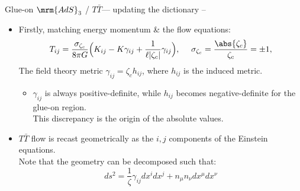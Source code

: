 \documentclass[
	10pt
	,handout
	,noamsthm
]{beamer}
\newcommand{\TTbar}{\texorpdfstring{\ensuremath{T\bar{T}}}{TTbar}\xspace}
\begin{document}
\begin{frame}{Glue-on $\mrm{AdS}_3$ / \TTbar --- updating the dictionary}{%
	\textcite{Kraus:2018xrn} -- 
}
\begin{itemize}
\item Firstly, matching energy momentum \& the flow equations:
	\begin{equation}
		T_{ij}= \frac{\sigma_{\zeta_c}}{8\pi G} \Big( K_{ij} -  K \gamma_{ij} + \frac{1}{\ell |\zeta_c|}\gamma_{ij}\Big), \ \quad \sigma_{\zeta_c} = \frac{\abs{\zeta_c}}{\zeta_c} = \pm 1,
		\label{BYtensor}
	\end{equation}
	The field theory metric $\gamma_{ij} = \zeta_c h_{ij}$, where $h_{ij}$ is the induced metric.
	
	\pause
	
	\begin{itemize}
	\item $\gamma_{ij}$ is always positive-definite, while $h_{ij}$ becomes negative-definite for the glue-on region.\\
		This discrepancy is the origin of the absolute values.
	\end{itemize}
	
	\pause
	
\item \TTbar flow is recast geometrically as the $i,j$ components of the Einstein equations. \\
Note that the geometry can be decomposed such that:
	\begin{equation}
		ds^2 = \frac{1}{\zeta} \gamma_{ij}dx^i dx^j+n_\mu n_\nu dx^\mu dx^\nu
	\end{equation}
\end{itemize}
\end{frame}
\end{document}
